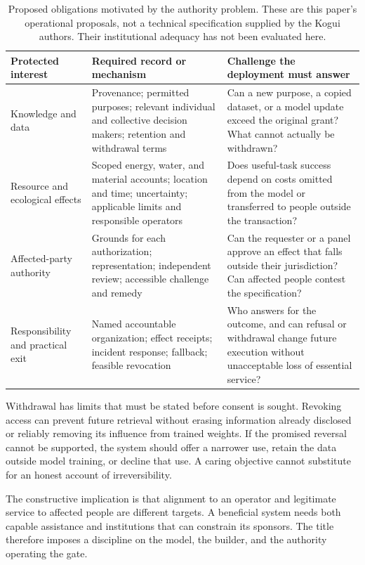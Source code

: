 \begin{table}[t]
\centering\small
\setlength{\tabcolsep}{4pt}
\begin{tabularx}{\textwidth}{@{}P{.17\textwidth}LL@{}}
\toprule
\textbf{Protected interest} & \textbf{Required record or mechanism} & \textbf{Challenge the deployment must answer}\\
\midrule
Knowledge and data & Provenance; permitted purposes; relevant individual and collective decision makers; retention and withdrawal terms & Can a new purpose, a copied dataset, or a model update exceed the original grant? What cannot actually be withdrawn?\\
Resource and ecological effects & Scoped energy, water, and material accounts; location and time; uncertainty; applicable limits and responsible operators & Does useful-task success depend on costs omitted from the model or transferred to people outside the transaction?\\
Affected-party authority & Grounds for each authorization; representation; independent review; accessible challenge and remedy & Can the requester or a panel approve an effect that falls outside their jurisdiction? Can affected people contest the specification?\\
Responsibility and practical exit & Named accountable organization; effect receipts; incident response; fallback; feasible revocation & Who answers for the outcome, and can refusal or withdrawal change future execution without unacceptable loss of essential service?\\
\bottomrule
\end{tabularx}
\caption{Proposed obligations motivated by the authority problem. These are this paper's operational proposals, not a technical specification supplied by the Kogui authors. Their institutional adequacy has not been evaluated here.}
\label{tab:legitimacy}
\end{table}

Withdrawal has limits that must be stated before consent is sought. Revoking access can prevent future retrieval without erasing information already disclosed or reliably removing its influence from trained weights. If the promised reversal cannot be supported, the system should offer a narrower use, retain the data outside model training, or decline that use. A caring objective cannot substitute for an honest account of irreversibility.

The constructive implication is that alignment to an operator and legitimate service to affected people are different targets. A beneficial system needs both capable assistance and institutions that can constrain its sponsors. The title therefore imposes a discipline on the model, the builder, and the authority operating the gate.
